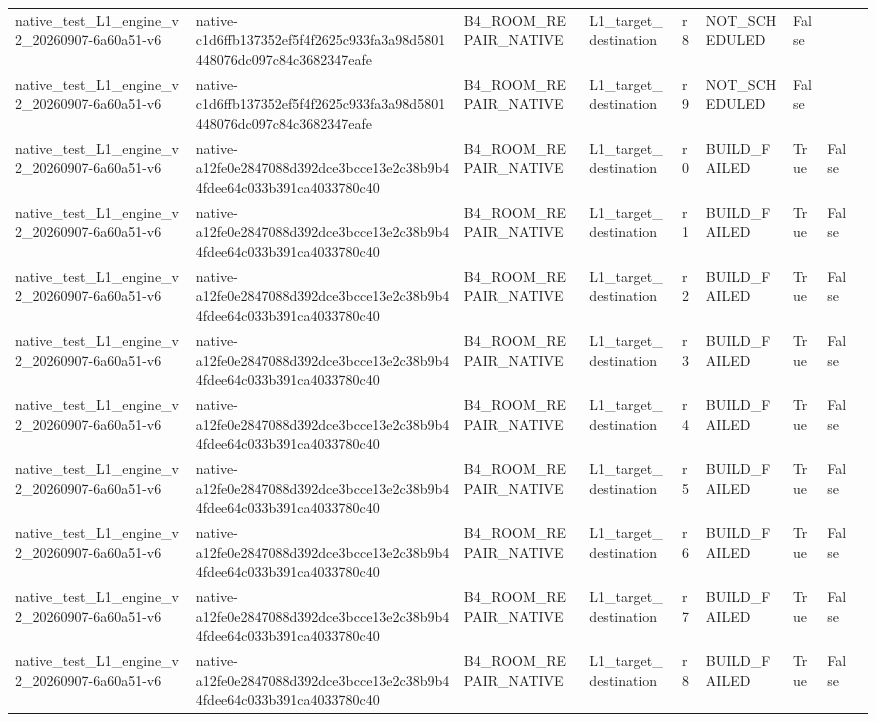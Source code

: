 \begin{tabular}{lllllllll}
native\_test\_L1\_engine\_v2\_20260907-6a60a51-v6 & native-c1d6ffb137352ef5f4f2625c933fa3a98d5801448076dc097c84c3682347eafe & B4\_ROOM\_REPAIR\_NATIVE & L1\_target\_destination & r8 & NOT\_SCHEDULED & False &  &  \\
native\_test\_L1\_engine\_v2\_20260907-6a60a51-v6 & native-c1d6ffb137352ef5f4f2625c933fa3a98d5801448076dc097c84c3682347eafe & B4\_ROOM\_REPAIR\_NATIVE & L1\_target\_destination & r9 & NOT\_SCHEDULED & False &  &  \\
native\_test\_L1\_engine\_v2\_20260907-6a60a51-v6 & native-a12fe0e2847088d392dce3bcce13e2c38b9b44fdee64c033b391ca4033780c40 & B4\_ROOM\_REPAIR\_NATIVE & L1\_target\_destination & r0 & BUILD\_FAILED & True & False &  \\
native\_test\_L1\_engine\_v2\_20260907-6a60a51-v6 & native-a12fe0e2847088d392dce3bcce13e2c38b9b44fdee64c033b391ca4033780c40 & B4\_ROOM\_REPAIR\_NATIVE & L1\_target\_destination & r1 & BUILD\_FAILED & True & False &  \\
native\_test\_L1\_engine\_v2\_20260907-6a60a51-v6 & native-a12fe0e2847088d392dce3bcce13e2c38b9b44fdee64c033b391ca4033780c40 & B4\_ROOM\_REPAIR\_NATIVE & L1\_target\_destination & r2 & BUILD\_FAILED & True & False &  \\
native\_test\_L1\_engine\_v2\_20260907-6a60a51-v6 & native-a12fe0e2847088d392dce3bcce13e2c38b9b44fdee64c033b391ca4033780c40 & B4\_ROOM\_REPAIR\_NATIVE & L1\_target\_destination & r3 & BUILD\_FAILED & True & False &  \\
native\_test\_L1\_engine\_v2\_20260907-6a60a51-v6 & native-a12fe0e2847088d392dce3bcce13e2c38b9b44fdee64c033b391ca4033780c40 & B4\_ROOM\_REPAIR\_NATIVE & L1\_target\_destination & r4 & BUILD\_FAILED & True & False &  \\
native\_test\_L1\_engine\_v2\_20260907-6a60a51-v6 & native-a12fe0e2847088d392dce3bcce13e2c38b9b44fdee64c033b391ca4033780c40 & B4\_ROOM\_REPAIR\_NATIVE & L1\_target\_destination & r5 & BUILD\_FAILED & True & False &  \\
native\_test\_L1\_engine\_v2\_20260907-6a60a51-v6 & native-a12fe0e2847088d392dce3bcce13e2c38b9b44fdee64c033b391ca4033780c40 & B4\_ROOM\_REPAIR\_NATIVE & L1\_target\_destination & r6 & BUILD\_FAILED & True & False &  \\
native\_test\_L1\_engine\_v2\_20260907-6a60a51-v6 & native-a12fe0e2847088d392dce3bcce13e2c38b9b44fdee64c033b391ca4033780c40 & B4\_ROOM\_REPAIR\_NATIVE & L1\_target\_destination & r7 & BUILD\_FAILED & True & False &  \\
native\_test\_L1\_engine\_v2\_20260907-6a60a51-v6 & native-a12fe0e2847088d392dce3bcce13e2c38b9b44fdee64c033b391ca4033780c40 & B4\_ROOM\_REPAIR\_NATIVE & L1\_target\_destination & r8 & BUILD\_FAILED & True & False &  \\

\end{tabular}
